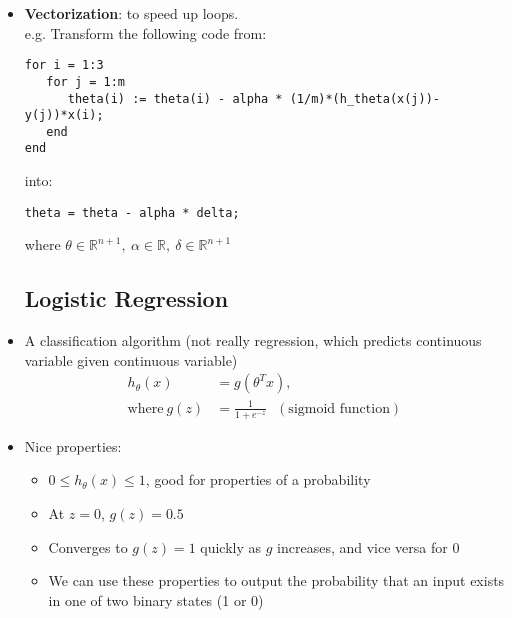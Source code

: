 \documentclass[titlepage]{article}
\begin{document}
\begin{itemize}
\begin{table} [!htbp]
	\caption{Pros and Cons}
\end{table}


\newpage

\item \textbf{Vectorization}: to speed up loops.\\
e.g. Transform the following code from: 

\begin{Verbatim}[obeytabs]
for i = 1:3
   for j = 1:m
      theta(i) := theta(i) - alpha * (1/m)*(h_theta(x(j))-y(j))*x(i);
   end
end
\end{Verbatim}


into:
\begin{verbatim}
theta = theta - alpha * delta;
\end{verbatim}

where $\theta \in \mathbb{R}^{n+1},\ \alpha \in \mathbb{R},\ \delta \in \mathbb{R}^{n+1}$

\subsection{Logistic Regression}
\item A classification algorithm (not really regression, which predicts continuous variable given continuous variable)
\begin{align*}
h_\theta (x) &= g(\theta^Tx), \\
\text{where} \ g(z) &= \frac{1}{1+e^{-z}} \ \ \ (\text{sigmoid function})
\end{align*}

\begin{center}
\end{center}

\item Nice properties:
\begin{itemize} [label = $\bullet$]
	\item {$0 \leq h_\theta (x) \leq 1$}, good for properties of a probability
	\item At $z=0$, $g(z) = 0.5$
	\item Converges to $g(z) =1$ quickly as $g$ increases, and vice versa for 0
	\item We can use these properties to output the probability that an input exists in one of two binary states (1 or 0)
\end{itemize}



\end{itemize}
\end{document}

